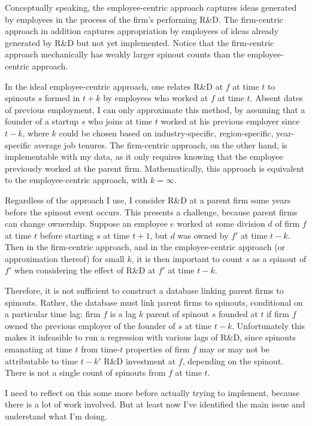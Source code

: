 \documentclass[12pt,english]{article}
\theoremstyle{remark}
\begin{document}
Conceptually speaking, the employee-centric approach captures ideas generated by employees in the process of the firm's performing R\&D. The firm-centric approach in addition captures appropriation by employees of ideas already generated by R\&D but not yet implemented. Notice that the firm-centric approach mechanically has weakly larger spinout counts than the employee-centric approach. 

In the ideal employee-centric approach, one relates R\&D at $f$ at time $t$ to spinouts $s$ formed in $t+k$ by employees who worked at $f$ at time $t$. Absent dates of previous employment, I can only approximate this method, by assuming that a founder of a startup $s$ who joins at time $t$ worked at his previous employer since $t-k$, where $k$ could be chosen based on industry-specific, region-specific, year-specific average job tenures. The firm-centric approach, on the other hand, is implementable with my data, as it only requires knowing that the employee previously worked at the parent firm. Mathematically, this approach is equivalent to the employee-centric approach, with $k = \infty$. 

Regardless of the approach I use, I consider R\&D at a parent firm some years before the spinout event occurs. This presents a challenge, because parent firms can change ownership. Suppose an employee $e$ worked at some division $d$ of firm $f$ at time $t$ before starting $s$ at time $t+1$, but $d$ was owned by $f'$ at time $t-k$. Then in the firm-centric approach, and in the employee-centric approach (or approximation thereof) for small $k$, it is then important to count $s$ as a spinout of $f'$ when considering the effect of R\&D at $f'$ at time $t-k$. 

Therefore, it is not sufficient to construct a database linking parent firms to spinouts. Rather, the database must link parent firms to spinouts, conditional on a particular time lag: firm $f$ is a lag $k$ parent of spinout $s$ founded at $t$ if firm $f$ owned the previous employer of the founder of $s$ at time $t - k$. Unfortunately this makes it infeasible to run a regression with various lags of R\&D, since spinouts emanating at time $t$ from time-$t$ properties of firm $f$ may or may not be attributable to time $t-k'$ R\&D investment at $f$, depending on the spinout. There is not a single count of spinouts from $f$ at time $t$. 

I need to reflect on this some more before actually trying to implement, because there is a lot of work involved. But at least now I've identified the main issue and understand what I'm doing. 
\end{document}
